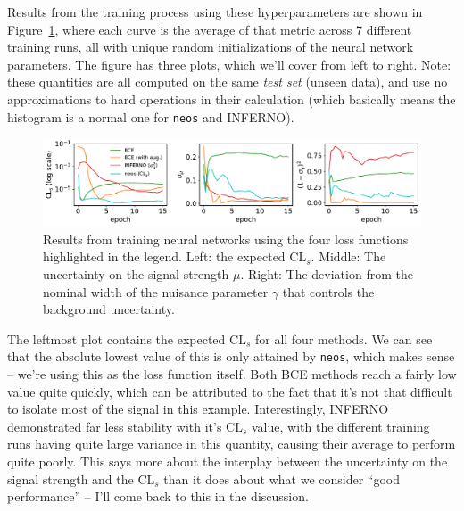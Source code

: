 \documentclass[
  11pt,
  numbers=noendperiod]{book}
\begin{document}
Results from the training process using these hyperparameters are shown
in Figure~\ref{fig-neos-results}, where each curve is the average of
that metric across 7 different training runs, all with unique random
initializations of the neural network parameters. The figure has three
plots, which we'll cover from left to right. Note: these quantities are
all computed on the same \emph{test set} (unseen data), and use no
approximations to hard operations in their calculation (which basically
means the histogram is a normal one for \texttt{neos} and INFERNO).

\begin{figure}

{\centering \includegraphics{./images/neos-results.pdf}

}

\caption{\label{fig-neos-results}Results from training neural networks
using the four loss functions highlighted in the legend. Left: the
expected \(\text{CL}_s\). Middle: The uncertainty on the signal strength
\(\mu\). Right: The deviation from the nominal width of the nuisance
parameter \(\gamma\) that controls the background uncertainty.}

\end{figure}

The leftmost plot contains the expected \(\mathrm{CL}_s\) for all four
methods. We can see that the absolute lowest value of this is only
attained by \texttt{neos}, which makes sense -- we're using this as the
loss function itself. Both BCE methods reach a fairly low value quite
quickly, which can be attributed to the fact that it's not that
difficult to isolate most of the signal in this example. Interestingly,
INFERNO demonstrated far less stability with it's \(\mathrm{CL}_s\)
value, with the different training runs having quite large variance in
this quantity, causing their average to perform quite poorly. This says
more about the interplay between the uncertainty on the signal strength
and the \(\mathrm{CL}_s\) than it does about what we consider ``good
performance'' -- I'll come back to this in the discussion.
\end{document}
